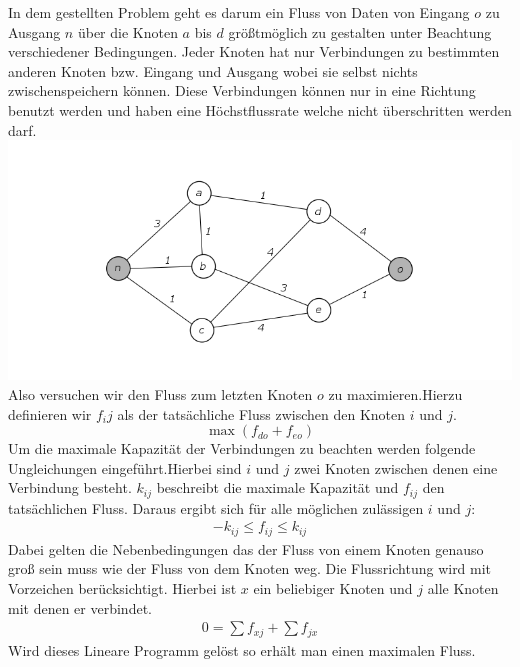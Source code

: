	In dem gestellten Problem geht es darum ein Fluss von Daten von Eingang $o$ zu Ausgang $n$ über die Knoten $a$ bis $d$ größtmöglich zu gestalten unter Beachtung verschiedener Bedingungen.  Jeder Knoten hat nur Verbindungen zu bestimmten anderen Knoten bzw. Eingang und Ausgang wobei sie selbst nichts zwischenspeichern können. Diese Verbindungen können nur in eine Richtung benutzt werden und haben eine Höchstflussrate welche nicht überschritten werden darf.
	\includegraphics*[width=\textwidth]{Grafiken/Netzwerkflussbild.png}
	Also versuchen wir den Fluss zum letzten Knoten $o$ zu maximieren.Hierzu definieren wir $f_ij$ als der tatsächliche Fluss zwischen den Knoten $i$ und $j$.
	\[ \max(f_{do}+f_{eo}) \]
	Um die maximale Kapazität der Verbindungen zu beachten werden folgende Ungleichungen eingeführt.Hierbei sind $i$ und $j$ zwei Knoten zwischen denen eine Verbindung besteht. $k_{ij}$ beschreibt die maximale Kapazität und $f_{ij}$ den tatsächlichen Fluss. Daraus ergibt sich für alle möglichen zulässigen $i$ und $j$:  
	\begin{align*}
		-k_{ij} \leq f_{ij} \leq k_{ij}
	\end{align*}
	Dabei gelten die Nebenbedingungen das der Fluss von einem Knoten genauso groß sein muss wie der Fluss von dem Knoten weg. Die Flussrichtung wird mit Vorzeichen berücksichtigt. Hierbei ist $x$ ein beliebiger Knoten und $j$ alle Knoten mit denen er verbindet.
	\begin{align*}
	0=\sum{f_{xj}}+\sum{f_{jx}}
	\end{align*}
	Wird dieses Lineare Programm gelöst so erhält man einen maximalen Fluss. 
	
	
	
	